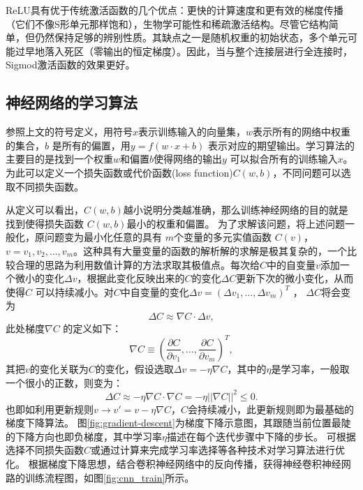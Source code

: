 ReLU具有优于传统激活函数的几个优点：更快的计算速度和更有效的梯度传播（它们不像S形单元那样饱和），生物学可能性和稀疏激活结构。尽管它结构简单，但仍然保持足够的辨别性质。其缺点之一是随机权重的初始状态，多个单元可能过早地落入死区（零输出的恒定梯度）。因此，当与整个连接层进行全连接时，Sigmod激活函数的效果更好。

\subsection{神经网络的学习算法}
参照上文的符号定义，用符号$x $表示训练输入的向量集，$w$表示所有的网络中权重的集合，$b$ 是所有的偏置，用$y=f(w\cdot x + b)$ 表示对应的期望输出。学习算法的主要目的是找到一个权重$w$和偏置$b$使得网络的输出$y$ 可以拟合所有的训练输入$x$。为此可以定义一个损失函数或代价函数(loss function)$C(w,b)$，不同问题可以选取不同损失函数。

从定义可以看出，$C(w,b) $越小说明分类越准确，那么训练神经网络的目的就是找到使得损失函数 $C(w,b)$最小的权重和偏置。
为了求解该问题，将上述问题一般化，原问题变为最小化任意的具有 $m $个变量的多元实值函数 $C(v) $， $v=v_1,v_2,\dots,v_m $。这种具有大量变量的函数的解析解的求解是极其复杂的，一个比较合理的思路为利用数值计算的方法求取其极值点。每次给$C $中的自变量$v$添加一个微小的变化$\Delta v $，根据此变化反映出来的$C $的变化$\Delta C $更新下次的微小变化，从而使得$C $ 可以持续减小。对$C $中自变量的变化$\Delta v=(\Delta v_1,\dots,\Delta v_m)^T $ ， $\Delta C $将会变为
\begin{equation}
\Delta C \approx \nabla C \cdot \Delta v,
    \label{equ:gradient1}
\end{equation}
此处梯度$\nabla C $ 的定义如下：
\begin{equation}
\nabla C \equiv (\frac{\partial C}{\partial v_1},\dots,\frac{\partial C}{\partial v_m})^T,
\end{equation}
其把$v$的变化关联为$C$的变化，假设选取$\Delta v=-\eta \nabla C $，其中的$\eta $是学习率，一般取一个很小的正数，则变为：
\begin{equation}
\Delta C \approx -\eta\nabla C\cdot\nabla C=-\eta||\nabla C||^2 \leq 0.
\end{equation}
也即如利用更新规则$v \rightarrow v'=v-\eta \nabla C$，$C$会持续减小，此更新规则即为最基础的梯度下降算法。
图\ref{fig:gradient-descent}为梯度下降示意图，其跟随当前位置最陡的下降方向也即负梯度，其中学习率$\eta $描述在每个迭代步骤中下降的步长。
可根据选择不同损失函数$C$或通过计算来完成学习率选择等各种技术对学习算法进行优化。
根据梯度下降思想，结合卷积神经网络中的反向传播，获得神经卷积神经网路的训练流程图，如图\ref{fig:cnn_train}所示。


